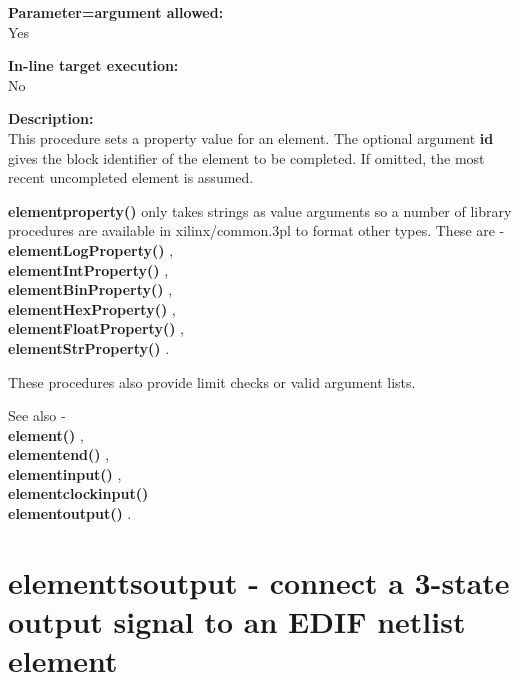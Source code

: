        {\bf Parameter=argument allowed:} \\
        Yes
        
        {\bf In-line target execution:} \\
        No
        
        {\bf Description:} \\
        This procedure sets a property value for an element.
        The optional argument {\bf id} gives the block identifier of the element
        to be completed. If omitted, the most recent uncompleted element
        is assumed.

        {\bf elementproperty()} only takes strings as value arguments so a number
        of library procedures are available in xilinx/common.3pl to format other
        types. These are - \\
        {\bf elementLogProperty()} , \\
        {\bf elementIntProperty()} , \\
        {\bf elementBinProperty()} , \\
        {\bf elementHexProperty()} , \\
        {\bf elementFloatProperty()} , \\
        {\bf elementStrProperty()} .
        
        These procedures also provide limit checks or valid argument lists.

        See also - \\
        {\bf element()} , \\
        {\bf elementend()} , \\
        {\bf elementinput()} , \\
        {\bf elementclockinput()}  \\
        {\bf elementoutput()} .




    \section{elementtsoutput - connect a 3-state output signal to an EDIF netlist element}\label{sec:ipelmntoutts}
        
